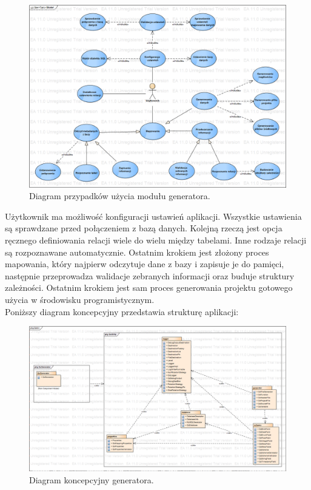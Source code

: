 \documentclass[12pt]{report}
\begin{document}
\begin{figure}[h]
	\centering
	\includegraphics[width=1.5\textwidth, angle=90]{images/QubicUseCase.png}
	\caption{Diagram przypadków użycia modułu generatora.}
\end{figure}
\FloatBarrier

Użytkownik ma możliwość konfiguracji ustawień aplikacji. Wszystkie ustawienia są sprawdzane przed połączeniem z bazą danych. Kolejną rzeczą jest opcja ręcznego definiowania relacji wiele do wielu między tabelami. Inne rodzaje relacji są rozpoznawane automatycznie. Ostatnim krokiem jest złożony proces mapowania, który najpierw odczytuje dane z bazy i zapisuje je do pamięci, następnie przeprowadza walidacje zebranych informacji oraz buduje struktury zależności. Ostatnim krokiem jest sam proces generowania projektu gotowego użycia w środowisku programistycznym. \\
	\indent Poniższy diagram koncepcyjny przedstawia strukturę aplikacji:
	
\begin{figure}[h]
	\centering
	\includegraphics[width=1.6\textwidth, angle=90]{images/Qubic.png}
	\caption{Diagram koncepcyjny generatora.}
\end{figure}
\FloatBarrier
\end{document}
